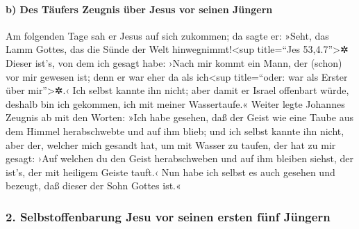 \hypertarget{b-des-tuxe4ufers-zeugnis-uxfcber-jesus-vor-seinen-juxfcngern}{%
\paragraph{b) Des Täufers Zeugnis über Jesus vor seinen
Jüngern}\label{b-des-tuxe4ufers-zeugnis-uxfcber-jesus-vor-seinen-juxfcngern}}

 Am folgenden Tage sah er Jesus auf sich zukommen; da
sagte er: »Seht, das Lamm Gottes, das die Sünde der Welt
hinwegnimmt!\textless sup title=``Jes 53,4.7''\textgreater✲
 Dieser ist's, von dem ich gesagt habe: ›Nach mir kommt
ein Mann, der (schon) vor mir gewesen ist; denn er war eher da als
ich\textless sup title=``oder: war als Erster über mir''\textgreater✲.‹
 Ich selbst kannte ihn nicht; aber damit er Israel
offenbart würde, deshalb bin ich gekommen, ich mit meiner Wassertaufe.«
 Weiter legte Johannes Zeugnis ab mit den Worten: »Ich
habe gesehen, daß der Geist wie eine Taube aus dem Himmel herabschwebte
und auf ihm blieb;  und ich selbst kannte ihn nicht, aber
der, welcher mich gesandt hat, um mit Wasser zu taufen, der hat zu mir
gesagt: ›Auf welchen du den Geist herabschweben und auf ihm bleiben
siehst, der ist's, der mit heiligem Geiste tauft.‹  Nun
habe ich selbst es auch gesehen und bezeugt, daß dieser der Sohn Gottes
ist.«

\hypertarget{selbstoffenbarung-jesu-vor-seinen-ersten-fuxfcnf-juxfcngern}{%
\subsubsection{2. Selbstoffenbarung Jesu vor seinen ersten fünf
Jüngern}\label{selbstoffenbarung-jesu-vor-seinen-ersten-fuxfcnf-juxfcngern}}

